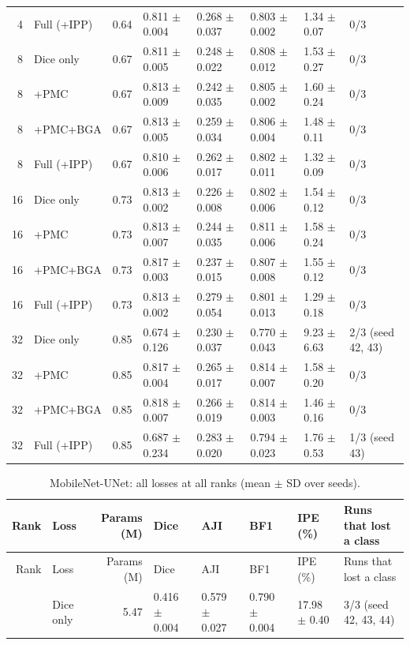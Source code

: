 \documentclass[10pt]{article}
\begin{document}
\begin{landscape}
{\begin{longtable}{r l r l l l l l}
4 & Full (+IPP) & 0.64 & 0.811 $\pm$ 0.004 & 0.268 $\pm$ 0.037 & 0.803 $\pm$ 0.002 & 1.34 $\pm$ 0.07 & 0/3 \\
8 & Dice only & 0.67 & 0.811 $\pm$ 0.005 & 0.248 $\pm$ 0.022 & 0.808 $\pm$ 0.012 & 1.53 $\pm$ 0.27 & 0/3 \\
8 & +PMC & 0.67 & 0.813 $\pm$ 0.009 & 0.242 $\pm$ 0.035 & 0.805 $\pm$ 0.002 & 1.60 $\pm$ 0.24 & 0/3 \\
8 & +PMC+BGA & 0.67 & 0.813 $\pm$ 0.005 & 0.259 $\pm$ 0.034 & 0.806 $\pm$ 0.004 & 1.48 $\pm$ 0.11 & 0/3 \\
8 & Full (+IPP) & 0.67 & 0.810 $\pm$ 0.006 & 0.262 $\pm$ 0.017 & 0.802 $\pm$ 0.011 & 1.32 $\pm$ 0.09 & 0/3 \\
16 & Dice only & 0.73 & 0.813 $\pm$ 0.002 & 0.226 $\pm$ 0.008 & 0.802 $\pm$ 0.006 & 1.54 $\pm$ 0.12 & 0/3 \\
16 & +PMC & 0.73 & 0.813 $\pm$ 0.007 & 0.244 $\pm$ 0.035 & 0.811 $\pm$ 0.006 & 1.58 $\pm$ 0.24 & 0/3 \\
16 & +PMC+BGA & 0.73 & 0.817 $\pm$ 0.003 & 0.237 $\pm$ 0.015 & 0.807 $\pm$ 0.008 & 1.55 $\pm$ 0.12 & 0/3 \\
16 & Full (+IPP) & 0.73 & 0.813 $\pm$ 0.002 & 0.279 $\pm$ 0.054 & 0.801 $\pm$ 0.013 & 1.29 $\pm$ 0.18 & 0/3 \\
32 & Dice only & 0.85 & 0.674 $\pm$ 0.126 & 0.230 $\pm$ 0.037 & 0.770 $\pm$ 0.043 & 9.23 $\pm$ 6.63 & 2/3 (seed 42, 43) \\
32 & +PMC & 0.85 & 0.817 $\pm$ 0.004 & 0.265 $\pm$ 0.017 & 0.814 $\pm$ 0.007 & 1.58 $\pm$ 0.20 & 0/3 \\
32 & +PMC+BGA & 0.85 & 0.818 $\pm$ 0.007 & 0.266 $\pm$ 0.019 & 0.814 $\pm$ 0.003 & 1.46 $\pm$ 0.16 & 0/3 \\
32 & Full (+IPP) & 0.85 & 0.687 $\pm$ 0.234 & 0.283 $\pm$ 0.020 & 0.794 $\pm$ 0.023 & 1.76 $\pm$ 0.53 & 1/3 (seed 43) \\
\end{longtable}
}
{\footnotesize
\begin{longtable}{r l r l l l l l}
\caption{MobileNet-UNet: all losses at all ranks (mean $\pm$ SD over seeds).}\label{tab:abl_mobilenet_unet}\\
\toprule
Rank & Loss & Params (M) & Dice & AJI & BF1 & IPE (\%) & Runs that lost a class \\
\midrule
\endfirsthead
\toprule
Rank & Loss & Params (M) & Dice & AJI & BF1 & IPE (\%) & Runs that lost a class \\
\midrule
\endhead
\bottomrule
\endfoot
2 & Dice only & 5.47 & 0.416 $\pm$ 0.004 & 0.579 $\pm$ 0.027 & 0.790 $\pm$ 0.004 & 17.98 $\pm$ 0.40 & 3/3 (seed 42, 43, 44) \\

\end{longtable}}
\end{landscape}
\end{document}

